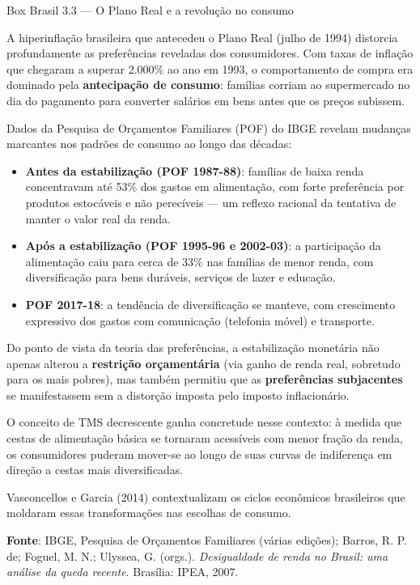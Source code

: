 \documentclass[11pt,twoside,openright]{book}
\providecommand{\tightlist}{\setlength{\itemsep}{0pt}\setlength{\parskip}{0pt}}
\begin{document}
\begin{boxbrasilbox}{Box Brasil 3.3 — O Plano Real e a revolução no consumo}

A hiperinflação brasileira que antecedeu o Plano Real (julho de 1994)
distorcia profundamente as preferências reveladas dos consumidores. Com
taxas de inflação que chegaram a superar 2.000\% ao ano em 1993, o
comportamento de compra era dominado pela \textbf{antecipação de
consumo}: famílias corriam ao supermercado no dia do pagamento para
converter salários em bens antes que os preços subissem.

Dados da Pesquisa de Orçamentos Familiares (POF) do IBGE revelam
mudanças marcantes nos padrões de consumo ao longo das décadas:

\begin{itemize}
\tightlist
\item
  \textbf{Antes da estabilização (POF 1987-88)}: famílias de baixa renda
  concentravam até 53\% dos gastos em alimentação, com forte preferência
  por produtos estocáveis e não perecíveis --- um reflexo racional da
  tentativa de manter o valor real da renda.
\item
  \textbf{Após a estabilização (POF 1995-96 e 2002-03)}: a participação
  da alimentação caiu para cerca de 33\% nas famílias de menor renda,
  com diversificação para bens duráveis, serviços de lazer e educação.
\item
  \textbf{POF 2017-18}: a tendência de diversificação se manteve, com
  crescimento expressivo dos gastos com comunicação (telefonia móvel) e
  transporte.
\end{itemize}

Do ponto de vista da teoria das preferências, a estabilização monetária
não apenas alterou a \textbf{restrição orçamentária} (via ganho de renda
real, sobretudo para os mais pobres), mas também permitiu que as
\textbf{preferências subjacentes} se manifestassem sem a distorção
imposta pelo imposto inflacionário.

O conceito de TMS decrescente ganha concretude nesse contexto: à medida
que cestas de alimentação básica se tornaram acessíveis com menor fração
da renda, os consumidores puderam mover-se ao longo de suas curvas de
indiferença em direção a cestas mais diversificadas.

Vasconcellos e Garcia (2014) contextualizam os ciclos econômicos
brasileiros que moldaram essas transformações nas escolhas de consumo.

\textbf{Fonte}: IBGE, Pesquisa de Orçamentos Familiares (várias
edições); Barros, R. P. de; Foguel, M. N.; Ulyssea, G. (orgs.).
\emph{Desigualdade de renda no Brasil: uma análise da queda recente}.
Brasília: IPEA, 2007.

\end{boxbrasilbox}
\end{document}
